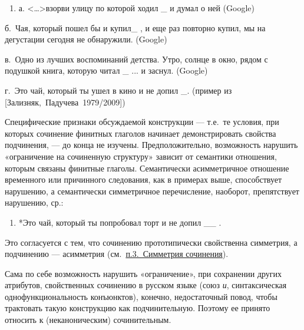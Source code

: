 \begin{enumerate}
  \def\labelenumi{(\arabic{enumi})}
  \setcounter{enumi}{55}
  \item
        а. \textless\ldots\textgreater взорви улицу по которой ходил \_ и
        думал о ней (Google)
\end{enumerate}

б.~Чая, который пошел бы и купил\_ , и еще раз повторно купил, мы на
дегустации сегодня не обнаружили. (Google)

в.~Одно из лучших воспоминаний детства. Утро, солнце в окно, рядом с
подушкой книга, которую читал \_ ... и заснул. (Google)

г.~Это чай, который ты ушел в кино и не допил \_. (пример из
{[}Зализняк,~Падучева~1979/2009{]})

Специфические признаки обсуждаемой конструкции --- т.е.~те условия, при
которых сочинение финитных глаголов начинает демонстрировать свойства
подчинения, --- до конца не изучены. Предположительно, возможность
нарушить «ограничение на сочиненную структуру» зависит от семантики
отношения, которым связаны финитные глаголы. Семантически асимметричное
отношение временного или причинного следования, как в примерах выше,
способствует нарушению, а семантически симметричное перечисление,
наоборот, препятствует нарушению, ср.:

\begin{enumerate}
  \def\labelenumi{(\arabic{enumi})}
  \setcounter{enumi}{56}
  \item
        *Это чай, который ты попробовал торт и не допил \_\_ .
\end{enumerate}

Это согласуется с тем, что сочинению прототипически свойственна
симметрия, а подчинению --- асимметрия (см.~\underline{п.3.~Симметрия
  сочинения}).

Сама по себе возможность нарушить «ограничение», при сохранении других
атрибутов, свойственных сочинению в русском языке (союз \textit{и},
синтаксическая однофункциональность конъюнктов), конечно, недостаточный
повод, чтобы трактовать такую конструкцию как подчинительную. Поэтому ее
принято относить к (неканоническим) сочинительным.

